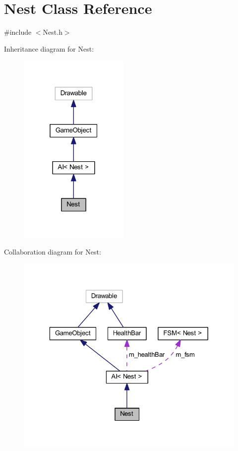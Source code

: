 \hypertarget{class_nest}{}\section{Nest Class Reference}
\label{class_nest}


{\ttfamily \#include $<$Nest.\+h$>$}



Inheritance diagram for Nest\+:\nopagebreak
\begin{figure}[H]
\begin{center}
\leavevmode
\includegraphics[width=151pt]{class_nest__inherit__graph}
\end{center}
\end{figure}


Collaboration diagram for Nest\+:\nopagebreak
\begin{figure}[H]
\begin{center}
\leavevmode
\includegraphics[width=323pt]{class_nest__coll__graph}
\end{center}
\end{figure}
